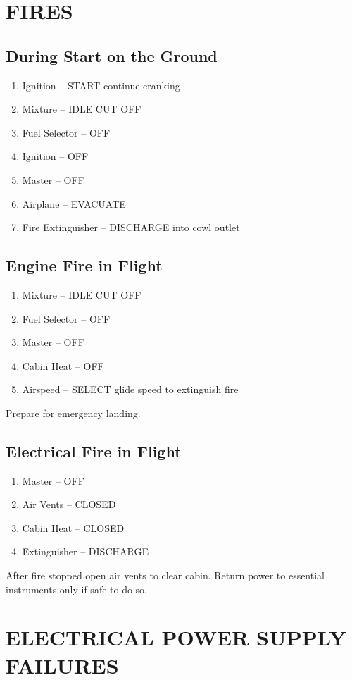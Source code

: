 \section{FIRES}
\subsection{During Start on the Ground}
\begin{enumerate}[(1)]
  \item Ignition -- START continue cranking
  \item Mixture -- IDLE CUT OFF
  \item Fuel Selector -- OFF
  \item Ignition -- OFF  
  \item Master -- OFF  
  \item Airplane -- EVACUATE
  \item Fire Extinguisher -- DISCHARGE into cowl outlet
\end{enumerate}

\subsection{Engine Fire in Flight}
\begin{enumerate}[(1)]
  \item Mixture -- IDLE CUT OFF
  \item Fuel Selector -- OFF
  \item Master -- OFF  
  \item Cabin Heat -- OFF
  \item Airspeed -- SELECT glide speed to extinguish fire
\end{enumerate}
 Prepare for emergency landing.

\subsection{Electrical Fire in Flight}
\begin{enumerate}[(1)]
  \item Master -- OFF  
  \item Air Vents -- CLOSED
  \item Cabin Heat -- CLOSED
  \item Extinguisher -- DISCHARGE 
\end{enumerate}
After fire stopped open air vents to clear cabin.  Return power to essential instruments only if safe to do so.

\section{ELECTRICAL POWER SUPPLY FAILURES}
